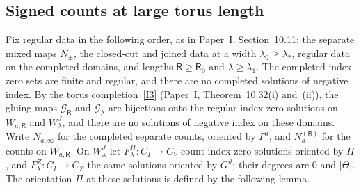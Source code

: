 \documentclass[11pt]{amsart}
\theoremstyle{definition}
\theoremstyle{remark}
\theoremstyle{plain}
\numberwithin{equation}{section}
\begin{document}
\subsection{Signed counts at large torus length}
\label{subsec:torus-counts}
Fix regular data in the following order, as in Paper~I, Section~10.11:
the separate mixed maps $N_\pm$, the closed-cut and joined data at a width
$\lambda_0\ge\lambda_*$, regular data on the completed domains, and lengths
$\mathsf R\ge\mathsf R_0$ and $\lambda\ge\lambda_1$. The completed
index-zero sets are finite and regular, and there are no completed
solutions of negative index. By the torus completion~\ref{I3} (Paper~I, Theorem~10.32(i) and~(ii)), the gluing
maps $\mathcal G_{\mathsf R}$ and $\mathcal G_\lambda$ are bijections onto
the regular index-zero solutions on $W_{a,\mathsf R}$ and $W^J_\lambda$, and
there are no solutions of negative index on these domains. Write
$N_{a,\infty}$ for the completed separate counts, oriented by
$\Gamma^a$, and $N_a^{(\mathsf R)}$ for the counts on $W_{a,\mathsf R}$.
On $W^J_\lambda$ let $F^\Pi_\lambda:C_I\to C_V$ count index-zero
solutions oriented by $\Pi$, and $F^Z_\lambda:C_I\to C_Z$ the same
solutions oriented by $G^{\vartheta}$; their degrees are $0$ and $|\Theta|$.
The orientation $\Pi$ at these solutions is defined by the following
lemma.
\end{document}
